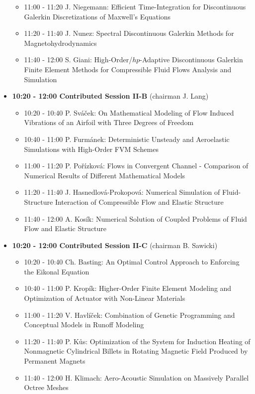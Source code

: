 \documentclass[10pt, A4]{article}%
\begin{document}
\begin{itemize}
\begin{itemize}
    \item 11:00 - 11:20 J. Niegemann: Efficient Time-Integration for Discontinuous Galerkin Discretizations of Maxwell's Equations
    \item 11:20 - 11:40 J. Nunez: Spectral Discontinuous Galerkin Methods for Magnetohydrodynamics
    \item 11:40 - 12:00 S. Giani: High-Order/$hp$-Adaptive Discontinuous Galerkin Finite Element Methods for Compressible Fluid Flows
Analysis and Simulation
  \end{itemize}
  \item {\bf 10:20 - 12:00 Contributed Session II-B} (chairman J. Lang) 
  \begin{itemize}
    \item 10:20 - 10:40 P. Sv\'{a}\v{c}ek: On Mathematical Modeling of Flow Induced Vibrations of an Airfoil with Three Degrees of Freedom
    \item 10:40 - 11:00 P. Furm\'{a}nek: Deterministic Unsteady and Aeroelastic Simulations with High-Order FVM Schemes
    \item 11:00 - 11:20 P. Po\v{r}\'{i}zkov\'{a}: Flows in Convergent Channel - Comparison of Numerical Results of Different Mathematical Models
    \item 11:20 - 11:40 J. Hasnedlov\'{a}-Prokopov\'{a}: Numerical Simulation of Fluid-Structure Interaction of Compressible Flow and Elastic Structure
    \item 11:40 - 12:00 A. Kos\'{i}k: Numerical Solution of Coupled Problems of Fluid Flow and Elastic Structure   
  \end{itemize}
    \item {\bf 10:20 - 12:00 Contributed Session II-C} (chairman B. Sawicki) 
  \begin{itemize}
    \item 10:20 - 10:40 Ch. Basting: An Optimal Control Approach to Enforcing the Eikonal Equation
    \item 10:40 - 11:00 P. Krop\'{i}k: Higher-Order Finite Element Modeling and Optimization of Actuator with Non-Linear Materials
    \item 11:00 - 11:20 V. Havl\'{i}\v{c}ek: Combination of Genetic Programming and Conceptual Models in Runoff Modeling
    \item 11:20 - 11:40 P. K\r{u}s: Optimization of the System for Induction Heating of Nonmagnetic Cylindrical Billets in Rotating Magnetic Field Produced by Permanent Magnets
    \item 11:40 - 12:00 H. Klimach: Aero-Acoustic Simulation on Massively Parallel Octree Meshes

\end{itemize}
\end{itemize}
\end{document}
